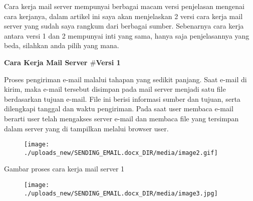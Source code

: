 \documentclass{wileySix}
\begin{document}
\begin{myEnumerate}
	Cara kerja mail server mempunyai berbagai macam versi penjelasan mengenai cara kerjanya, dalam artikel ini saya akan menjelaskan 2 versi cara kerja mail server yang sudah saya rangkum dari berbagai sumber. Sebenarnya cara kerja antara versi 1 dan 2 mempunyai inti yang sama, hanya saja penjelasannya yang beda, silahkan anda pilih yang mana. \par
	\vspace{12pt}
	\noindent 
	\textbf{Cara Kerja Mail Server  $  \#  $Versi 1} \par
	Proses pengiriman e-mail malalui tahapan yang sedikit panjang. Saat e-mail di kirim, maka e-mail tersebut disimpan pada mail server menjadi satu file berdasarkan tujuan e-mail. File ini berisi informasi sumber dan tujuan, serta dilengkapi tanggal dan waktu pengiriman. Pada saat user membaca e-mail berarti user telah mengakses server e-mail dan membaca file yang tersimpan dalam server yang di tampilkan melalui browser user. \par
	\vspace{12pt}
	\noindent 
	\begin{center}
		
		
		
		\begin{figure}[H]
			\begin{center}
				\texttt{[image: ./uploads\_new/SENDING\_EMAIL.docx\_DIR/media/image2.gif]}
			\end{center}
		\end{figure}
		
		
		
		
	\end{center}\vspace{12pt}
	\noindent 
	\begin{center}Gambar proses cara kerja mail server 1\end{center} \par
	\vspace{12pt}
	\noindent 
	\begin{center}
		
		
		
		\begin{figure}[H]
			\begin{center}
				\texttt{[image: ./uploads\_new/SENDING\_EMAIL.docx\_DIR/media/image3.jpg]}
			\end{center}
		\end{figure}
		

\end{center}
\end{myEnumerate}
\end{document}
